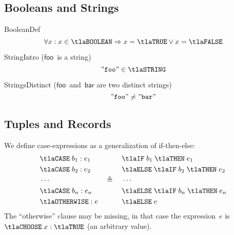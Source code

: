 \documentclass[11pt, a4paper, oneside]{article}
\begin{document}
    \subsection{Booleans and Strings}
    \label{subsec:bools_and_strings}

\begin{axioms}
\item[BooleanDef] \[
        \forall x : x \in \tlaBOOLEAN \imp x = \tlaTRUE \vee x = \tlaFALSE
    \]

\item[StringIntro ({\rm$\mathsf{foo}$~is a string})] \[
        \mkstr{foo} \in \tlaSTRING
    \]

\item[StringsDistinct ({\rm$\mathsf{foo}$~and~$\mathsf{bar}$ are two distinct strings})] \[
        \mathtt{"foo"} \neq \mathtt{"bar"}
    \]

\end{axioms}


    \subsection{Tuples and Records}
    \label{subsec:tups_and_recs}

We define case-expressions as a generalization of if-then-else: \[
    \begin{aligned}
        &\tlaCASE\; b_1 : e_1 \\
        &\tlaCASE\; b_2 : e_2 \\
        &\cdots \\
        &\tlaCASE\; b_n : e_n \\
        &\tlaOTHERWISE : e
    \end{aligned}
    \quad\triangleq\quad
    \begin{aligned}
        &\tlaIF\; b_1 \;\tlaTHEN\; e_1 \\
        &\tlaELSE\;\tlaIF\; b_2 \;\tlaTHEN\; e_2 \\
        &\cdots \\
        &\tlaELSE\;\tlaIF\; b_n \;\tlaTHEN\; e_n \\
        &\tlaELSE\; e
    \end{aligned}
\] The ``otherwise'' clause may be missing, in that case the expression~$e$ is $\tlaCHOOSE\; x : \tlaTRUE$ (an arbitrary value).
\end{document}
